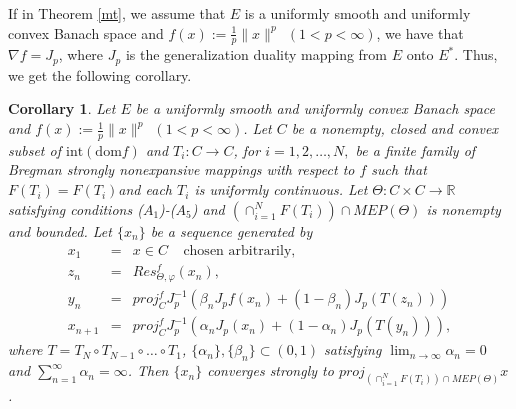\documentclass[reqno,b5paper]{amsart}
\theoremstyle{plain}
\newtheorem{corollary}[theorem]{Corollary}
\theoremstyle{definition}
\numberwithin{equation}{section}
\numberwithin{equation}{section}
\begin{document}
If in Theorem \ref{mt}, we assume that $E$ is a uniformly smooth and uniformly convex Banach space and $f(x):=\frac{1}{p}\|x\|^{p} \ \ (1<p<\infty)$, we have that $\nabla f=J_{p}$, where $J_{p}$ is the generalization duality mapping from $E$ onto $E^{*}$. Thus, we get the following corollary.
\begin{corollary}
Let $E$ be a uniformly smooth and uniformly convex Banach space and $f(x):=\frac{1}{p}\|x\|^{p} \ \ (1<p<\infty)$. Let $C$ be a nonempty, closed and convex subset of $\text{int}(\text{dom} f)$ and $T_{i}:C\to C$, for $i=1,2,\ldots, N,$ be a finite family of Bregman strongly nonexpansive mappings with respect to $f$ such that $F(T_{i})=\widehat{F}(T_{i})$and each $T_{i}$ is uniformly continuous. Let $\Theta:C\times C\to\mathbb{R}$ satisfying conditions ($A_{1}$)-($A_{5}$) and $\left(\cap_{i=1}^{N}F(T_{i})\right)\cap MEP(\Theta)$ is nonempty and bounded. Let $\{x_{n}\}$ be a sequence generated by 
\begin{eqnarray*}
x_{1}&=&x\in C \ \ \ \ \  \text{chosen arbitrarily},\nonumber\\
z_{n}&=&Res_{\Theta,\varphi}^{f}(x_{n}),\nonumber\\
y_{n}&=&proj_{C}^{f}J_{p}^{-1}(\beta_{n}J_{p} f(x_{n})+(1-\beta_{n})J_{p}(T(z_{n})))\nonumber\\
x_{n+1}&=&proj_{C}^{f}J_{p}^{-1}(\alpha_{n}J_{p}(x_{n})+(1-\alpha_{n})J_{p} (T(y_{n}))),
\end{eqnarray*}
where $T=T_{N}\circ T_{N-1}\circ\ldots\circ T_{1}$, $\{\alpha_{n}\}, \{\beta_{n}\}\subset (0,1)$ satisfying $\lim_{n\to\infty}\alpha_{n}=0$ and $\sum_{n=1}^{\infty}\alpha_{n}=\infty$. Then $\{x_{n}\}$ converges strongly to $proj_{(\cap_{i=1}^{N}F(T_{i}))\cap MEP(\Theta)}x$.\\

\end{corollary}
\end{document}
